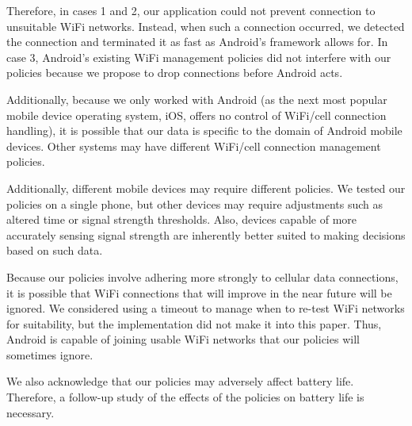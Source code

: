 Therefore, in cases 1 and 2, our application could not prevent connection to unsuitable WiFi networks. Instead, when such a connection occurred, we detected the connection and terminated it as fast as Android's framework allows for. In case 3, Android's existing WiFi management policies did not interfere with our policies because we propose to drop connections before Android acts.

Additionally, because we only worked with Android (as the next most popular mobile device operating system, iOS, offers no control of WiFi/cell connection handling), it is possible that our data is specific to the domain of Android mobile devices. Other systems may have different WiFi/cell connection management policies.

Additionally, different mobile devices may require different policies. We tested our policies on a single phone, but other devices may require adjustments such as altered time or signal strength thresholds. Also, devices capable of more accurately sensing signal strength are inherently better suited to making decisions based on such data.

Because our policies involve adhering more strongly to cellular data connections, it is possible that WiFi connections that will improve in the near future will be ignored. We considered using a timeout to manage when to re-test WiFi networks for suitability, but the implementation did not make it into this paper. Thus, Android is capable of joining usable WiFi networks that our policies will sometimes ignore.

We also acknowledge that our policies may adversely affect battery life. Therefore, a follow-up study of the effects of the policies on battery life is necessary.
